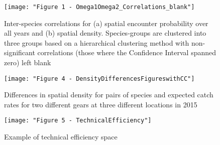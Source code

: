 \documentclass{nature}
\begin{document}
\begin{figure}
\begin{center}
	\texttt{[image: "Figure 1 - Omega1Omega2\_Correlations\_blank"]}
	\label{fig:3}
	\caption{Inter-species correlations for (a) spatial encounter
		probability over all years and (b) spatial density.
		Species-groups are clustered into three groups based on a
		hierarchical clustering method with non-significant
		correlations (those where the Confidence Interval spanned zero)
		left blank}
	\end{center}
\end{figure}

\begin{figure}
\begin{center}
	\texttt{[image: "Figure 4 - DensityDifferencesFigureswithCC"]}
	\label{fig:4}
	\caption{Differences in spatial density for pairs of species and
		expected catch rates for two different gears at three different
	locations in 2015}
\end{center}
\end{figure}

\begin{figure}
\begin{center}
	\texttt{[image: "Figure 5 - TechnicalEfficiency"]}
	\label{fig:5}
	\caption{Example of technical efficiency space}
\end{center}
\end{figure}
\end{document}
